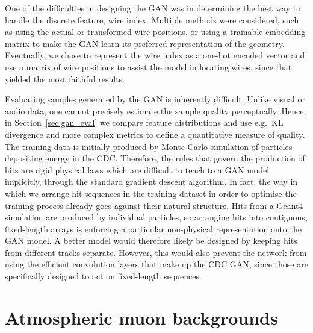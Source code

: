 One of the difficulties in designing the GAN was in determining the best way to
handle the discrete feature, wire index. Multiple methods were considered, such
as using the actual or transformed wire positions, or using a trainable
embedding matrix to make the GAN learn its preferred representation of the
geometry. Eventually, we chose to represent the wire index as a one-hot encoded
vector and use a matrix of wire positions to assist the model in locating wires,
since that yielded the most faithful results.

Evaluating samples generated by the GAN is inherently difficult. Unlike visual
or audio data, one cannot precisely estimate the sample quality perceptually.
Hence, in Section~\ref{sec:gan_eval} we compare feature distributions and use
e.g.\ KL divergence and more complex metrics to define a quantitative measure of
quality. 
The training data is initially produced by Monte Carlo simulation of
particles depositing energy in the CDC. Therefore, the rules that govern the
production of hits are rigid physical laws which are difficult to teach to a GAN
model implicitly, through the standard gradient descent algorithm. In fact, the
way in which we arrange hit sequences in the training dataset in order to
optimise the training process already goes against their natural structure. Hits
from a Geant4 simulation are produced by individual particles, so arranging hits
into contiguous, fixed-length arrays is enforcing a particular non-physical
representation onto the GAN model. A better model would therefore likely be
designed by keeping hits from different tracks separate. However, this would
also prevent the network from using the efficient convolution layers that make
up the CDC GAN, since those are specifically designed to act on fixed-length
sequences. 




\section{Atmospheric muon backgrounds}

